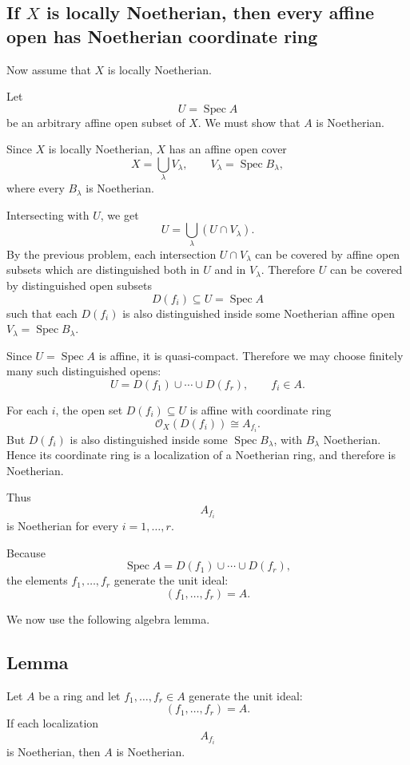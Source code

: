 \documentclass[12pt,a4paper]{article}
\DeclareMathOperator{\Spec}{Spec}
\providecommand{\Spec}{\operatorname{Spec}}
\theoremstyle{notespace}
\begin{document}
\subsection*{If \(X\) is locally Noetherian, then every affine open has Noetherian coordinate ring}

Now assume that \(X\) is locally Noetherian.

Let
\[
U=\Spec A
\]
be an arbitrary affine open subset of \(X\). We must show that \(A\) is Noetherian.

Since \(X\) is locally Noetherian, \(X\) has an affine open cover
\[
X=\bigcup_{\lambda} V_\lambda,
\qquad
V_\lambda=\Spec B_\lambda,
\]
where every \(B_\lambda\) is Noetherian.

Intersecting with \(U\), we get
\[
U=\bigcup_{\lambda} (U\cap V_\lambda).
\]
By the previous problem, each intersection \(U\cap V_\lambda\) can be covered by affine open subsets which are distinguished both in \(U\) and in \(V_\lambda\). Therefore \(U\) can be covered by distinguished open subsets
\[
D(f_i)\subseteq U=\Spec A
\]
such that each \(D(f_i)\) is also distinguished inside some Noetherian affine open \(V_\lambda=\Spec B_\lambda\).

Since \(U=\Spec A\) is affine, it is quasi-compact. Therefore we may choose finitely many such distinguished opens:
\[
U=D(f_1)\cup\cdots\cup D(f_r),
\qquad
f_i\in A.
\]

For each \(i\), the open set \(D(f_i)\subseteq U\) is affine with coordinate ring
\[
\mathcal O_X(D(f_i))\cong A_{f_i}.
\]
But \(D(f_i)\) is also distinguished inside some \(\Spec B_\lambda\), with \(B_\lambda\) Noetherian. Hence its coordinate ring is a localization of a Noetherian ring, and therefore is Noetherian.

Thus
\[
A_{f_i}
\]
is Noetherian for every \(i=1,\dots,r\).

Because
\[
\Spec A=D(f_1)\cup\cdots\cup D(f_r),
\]
the elements \(f_1,\dots,f_r\) generate the unit ideal:
\[
(f_1,\dots,f_r)=A.
\]

We now use the following algebra lemma.

\subsection*{Lemma}

Let \(A\) be a ring and let \(f_1,\dots,f_r\in A\) generate the unit ideal:
\[
(f_1,\dots,f_r)=A.
\]
If each localization
\[
A_{f_i}
\]
is Noetherian, then \(A\) is Noetherian.
\end{document}
